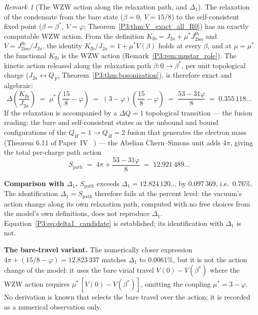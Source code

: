 \documentclass[11pt,a4paper]{article}
\theoremstyle{definition}
\theoremstyle{remark}
\newtheorem{remark}[theorem]{Remark}
\newcommand{\vp}{\varphi}
\newcommand{\bst}{\beta^{*}}
\newcommand{\Kfb}{K_{\mathrm{fb}}}
\newcommand{\Jfb}{J_{2\mathrm{iso}}^{\mathrm{fb}}}
\newcommand{\Ja}{J_{2a}}
\begin{document}
\begin{remark}[The WZW action along the relaxation path, and $\Delta_1$]
\label{P3:rem:delta1_candidate}
The relaxation of the condensate from the bare state ($\beta=0$,
$V=15/8$) to the self-consistent fixed point ($\beta=\bst$, $V=\vp$;
Theorem~\ref{P3:thm:V_exact_all_R0}) has an exactly computable WZW
action. From the definition $\Kfb = \Ja + \mu^*\Jfb$ and $V = \Jfb/\Ja$,
the identity $\Kfb/\Ja = 1 + \mu^*V(\beta)$ holds at every $\beta$, and
at $\mu = \mu^*$ the functional $\Kfb$ is the WZW action
(Remark~\ref{P3:rem:mustar_role}). The kinetic action released along
the relaxation path $\beta: 0 \to \bst$, per unit topological charge
($\Ja \leftrightarrow Q_F$, Theorem~\ref{P3:thm:bosonization}), is
therefore exact and algebraic:
\begin{equation}
  \Delta\!\left(\frac{\Kfb}{\Ja}\right)
  \;=\; \mu^*\!\left(\frac{15}{8}-\vp\right)
  \;=\; (3-\vp)\!\left(\frac{15}{8}-\vp\right)
  \;=\; \frac{53-31\vp}{8}
  \;=\; 0.355\,118\ldots
  \label{P3:eq:delta1_candidate}
\end{equation}
If the relaxation is accompanied by a $\Delta Q=1$ topological
transition --- the fusion reading: the bare and self-consistent states
as the unbound and bound configurations of the $Q_H{=}1\to Q_H{=}2$
fusion that generates the electron mass (Theorem 6.11 of
Paper~IV~\cite{Paper4}%
) --- the Abelian Chern--Simons unit adds $4\pi$, giving the total
per-charge path action
\[
  S_{\mathrm{path}} \;=\; 4\pi + \frac{53-31\vp}{8} \;=\; 12.921\,489\ldots
\]

\textbf{Comparison with $\Delta_1$.} $S_{\mathrm{path}}$ exceeds
$\Delta_1 = 12.824\,120\ldots$ by $0.097\,369$, i.e.\ $0.76\%$. The
identification $\Delta_1 = S_{\mathrm{path}}$ therefore fails at the
percent level: the vacuum's action change along its own relaxation
path, computed with no free choices from the model's own definitions,
does not reproduce $\Delta_1$.
Equation~\eqref{P3:eq:delta1_candidate} is established; its
identification with $\Delta_1$ is not.

\textbf{The bare-travel variant.} The numerically closer expression
$4\pi + (15/8-\vp) = 12.823\,337$ matches $\Delta_1$ to $0.0061\%$, but
it is not the action change of the model: it uses the bare virial
travel $V(0)-V(\bst)$ where the WZW action requires
$\mu^*\,[V(0)-V(\bst)]$, omitting the coupling $\mu^* = 3-\vp$. No
derivation is known that selects the bare travel over the action; it is
recorded as a numerical observation only.


\end{remark}
\end{document}
